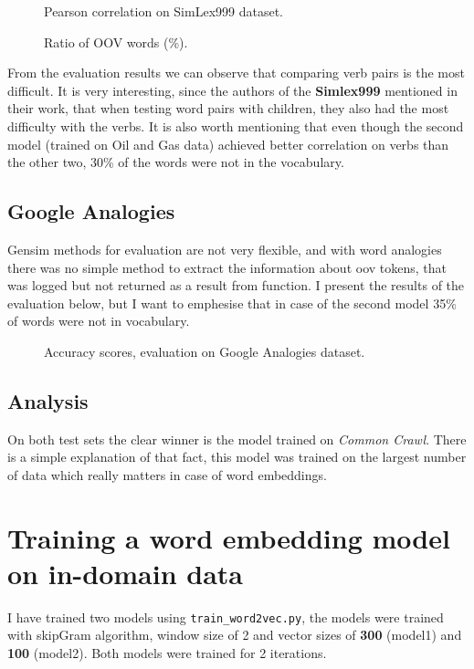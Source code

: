 \documentclass{article}
\begin{document}
\begin{figure}[h]
	\centering
	
	\caption{Pearson correlation on SimLex999 dataset.}
\end{figure}
\begin{figure}[h]
	\centering
	
	\caption{Ratio of OOV words (\%).}
\end{figure}

From the evaluation results we can observe that comparing verb pairs is the most difficult.
It is very interesting, since the authors of the \textbf{Simlex999} mentioned in their work,
that when testing word pairs with children, they also had the most difficulty with the verbs.
It is also worth mentioning that even though the second model (trained on Oil and Gas data)
achieved better correlation on verbs than the other two, 30\% of the words were not in the vocabulary.

\subsection{Google Analogies}
Gensim methods for evaluation are not very flexible, and with word analogies
there was no simple method to extract the information about oov tokens, that was logged but not
returned as a result from function. I present the results of the evaluation below, but
I want to emphesise that in case of the second model 35\% of words were not in vocabulary.

\begin{figure}[h]
	\centering
	
	\caption{Accuracy scores, evaluation on Google Analogies dataset.}
\end{figure}


\subsection{Analysis}
On both test sets the clear winner is the model trained on \textit{Common Crawl}. There is a
simple explanation of that fact, this model was trained on the largest number of data which really
matters in case of word embeddings. 

\section{ Training a word embedding model on in-domain data}
I have trained two models using \lstinline{train_word2vec.py}, the models were trained
with skipGram algorithm, window size of 2 and vector sizes of \textbf{300} (model1) and \textbf{100} (model2).
Both models were trained for 2 iterations.
\end{document}
